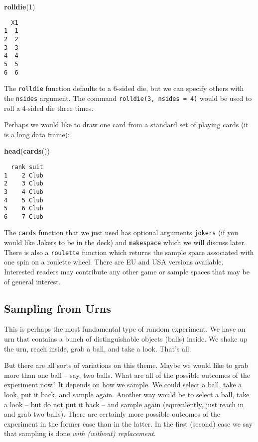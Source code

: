 \documentclass[]{book}
\newenvironment{Shaded}{\begin{snugshade}}{\end{snugshade}}
\newcommand{\KeywordTok}[1]{\textcolor[rgb]{0.13,0.29,0.53}{\textbf{{#1}}}}
\newcommand{\DecValTok}[1]{\textcolor[rgb]{0.00,0.00,0.81}{{#1}}}
\newcommand{\NormalTok}[1]{{#1}}
\numberwithin{equation}{chapter}
\numberwithin{figure}{chapter}
\theoremstyle{plain}
\theoremstyle{definition}
\theoremstyle{remark}
\theoremstyle{definition}
\theoremstyle{definition}
\theoremstyle{remark}
\begin{document}
\begin{Shaded}
\begin{Highlighting}[]
\KeywordTok{rolldie}\NormalTok{(}\DecValTok{1}\NormalTok{) }
\end{Highlighting}
\end{Shaded}

\begin{verbatim}
  X1
1  1
2  2
3  3
4  4
5  5
6  6
\end{verbatim}

The \texttt{rolldie} function defaults to a 6-sided die, but we can
specify others with the \texttt{nsides} argument. The command
\texttt{rolldie(3,\ nsides\ =\ 4)} would be used to roll a 4-sided die
three times.

Perhaps we would like to draw one card from a standard set of playing
cards (it is a long data frame):

\begin{Shaded}
\begin{Highlighting}[]
\KeywordTok{head}\NormalTok{(}\KeywordTok{cards}\NormalTok{()) }
\end{Highlighting}
\end{Shaded}

\begin{verbatim}
  rank suit
1    2 Club
2    3 Club
3    4 Club
4    5 Club
5    6 Club
6    7 Club
\end{verbatim}

The \texttt{cards} function that we just used has optional arguments
\texttt{jokers} (if you would like Jokers to be in the deck) and
\texttt{makespace} which we will discuss later. There is also a
\texttt{roulette} function which returns the sample space associated
with one spin on a roulette wheel. There are EU and USA versions
available. Interested readers may contribute any other game or sample
spaces that may be of general interest.

\subsection{Sampling from Urns}\label{sub-sampling-from-urns}

This is perhaps the most fundamental type of random experiment. We have
an urn that contains a bunch of distinguishable objects (balls) inside.
We shake up the urn, reach inside, grab a ball, and take a look. That's
all.

But there are all sorts of variations on this theme. Maybe we would like
to grab more than one ball -- say, two balls. What are all of the
possible outcomes of the experiment now? It depends on how we sample. We
could select a ball, take a look, put it back, and sample again. Another
way would be to select a ball, take a look -- but do not put it back --
and sample again (equivalently, just reach in and grab two balls). There
are certainly more possible outcomes of the experiment in the former
case than in the latter. In the first (second) case we say that sampling
is done \emph{with (without) replacement}.
\end{document}

